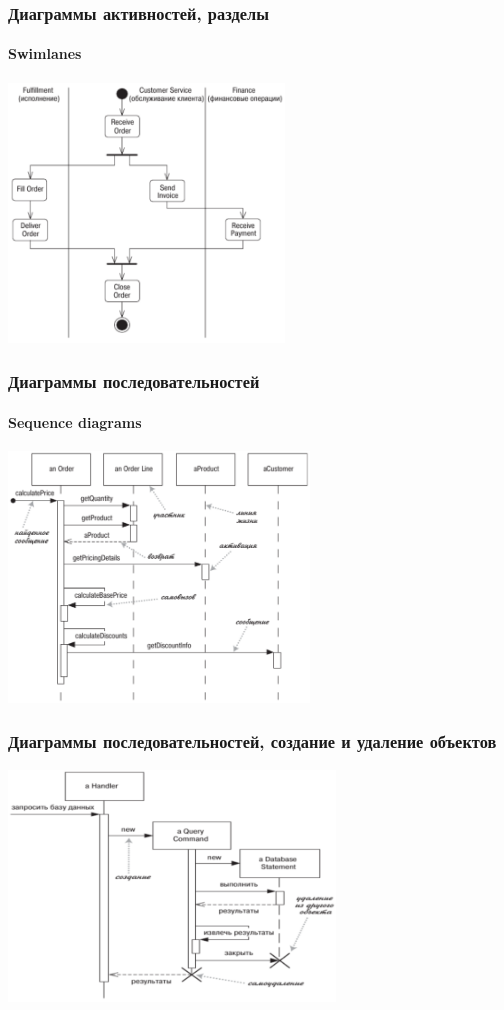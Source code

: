 \documentclass[xetex,mathserif,serif]{beamer}
\begin{document}
	\begin{frame}
		\frametitle{Диаграммы активностей, разделы}
		\framesubtitle{Swimlanes}
		\begin{center}
			\includegraphics[width=0.55\textwidth]{activitySwimlanes.png}
		\end{center}
	\end{frame}

	\begin{frame}
		\frametitle{Диаграммы последовательностей}
		\framesubtitle{Sequence diagrams}
		\begin{center}
			\includegraphics[width=0.6\textwidth]{sequenceDiagram.png}
		\end{center}
	\end{frame}

	\begin{frame}
		\frametitle{Диаграммы последовательностей, создание и удаление объектов}
		\begin{center}
			\includegraphics[width=0.65\textwidth]{sequenceLifeCycle.png}
		\end{center}
	\end{frame}
\end{document}
